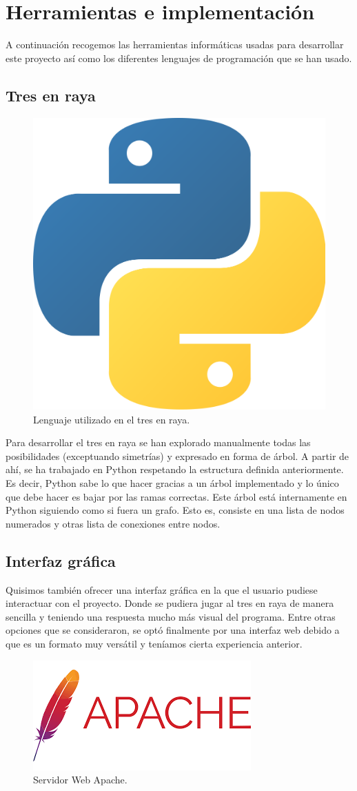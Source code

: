 \documentclass[11pt]{article}
\begin{document}
\section{Herramientas e implementación}

A continuación recogemos las herramientas informáticas usadas para desarrollar
este proyecto así como los diferentes lenguajes de programación que se han
usado.


\subsection{Tres en raya}

\begin{figure}
  \centering
  \includegraphics[width = .15\textwidth]{Logo_Python.png}
  \caption{Lenguaje utilizado en el tres en raya.}
  \label{fig:python}
\end{figure}

Para desarrollar el tres en raya se han explorado manualmente todas las
posibilidades (exceptuando simetrías) y expresado en forma de árbol. A partir de
ahí, se ha trabajado en Python respetando la estructura definida
anteriormente. Es decir, Python sabe lo que hacer gracias a un árbol
implementado y lo único que debe hacer es bajar por las ramas correctas. Este
árbol está internamente en Python siguiendo como si fuera un grafo. Esto es,
consiste en una lista de nodos numerados y otras lista de conexiones entre
nodos. \\


\subsection{Interfaz gráfica}

Quisimos también ofrecer una interfaz gráfica en la que el usuario pudiese
interactuar con el proyecto. Donde se pudiera jugar al tres en raya de manera
sencilla y teniendo una respuesta mucho más visual del programa. Entre otras
opciones que se consideraron, se optó finalmente por una interfaz web debido a
que es un formato muy versátil y teníamos cierta experiencia anterior. \\

\begin{figure}
  \centering
  \hfill
  \includegraphics[width = .25\textwidth]{Logo_Apache.png}
  \caption{Servidor Web Apache.}
  \label{fig:apache}
\end{figure}
\end{document}
